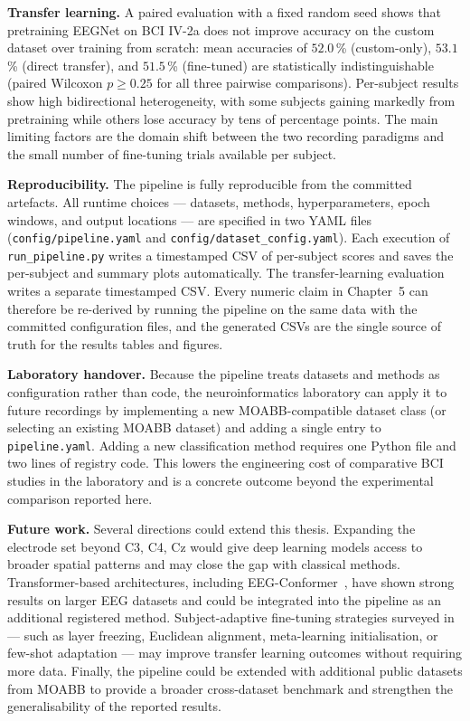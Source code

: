 \documentclass[english, bc, kiv, he, iso690alph, pdf]{fasthesis}
\begin{document}
\textbf{Transfer learning.} A paired evaluation with a fixed random seed shows that pretraining EEGNet on BCI IV-2a does not improve accuracy on the custom dataset over training from scratch: mean accuracies of $52.0$\,\% (custom-only), $53.1$\,\% (direct transfer), and $51.5$\,\% (fine-tuned) are statistically indistinguishable (paired Wilcoxon $p \geq 0.25$ for all three pairwise comparisons). Per-subject results show high bidirectional heterogeneity, with some subjects gaining markedly from pretraining while others lose accuracy by tens of percentage points. The main limiting factors are the domain shift between the two recording paradigms and the small number of fine-tuning trials available per subject.

\textbf{Reproducibility.} The pipeline is fully reproducible from the committed artefacts. All runtime choices — datasets, methods, hyperparameters, epoch windows, and output locations — are specified in two YAML files (\texttt{config/pipeline.yaml} and \texttt{config/dataset\_config.yaml}). Each execution of \texttt{run\_pipeline.py} writes a timestamped CSV of per-subject scores and saves the per-subject and summary plots automatically. The transfer-learning evaluation writes a separate timestamped CSV. Every numeric claim in Chapter~5 can therefore be re-derived by running the pipeline on the same data with the committed configuration files, and the generated CSVs are the single source of truth for the results tables and figures.

\textbf{Laboratory handover.} Because the pipeline treats datasets and methods as configuration rather than code, the neuroinformatics laboratory can apply it to future recordings by implementing a new MOABB-compatible dataset class (or selecting an existing MOABB dataset) and adding a single entry to \texttt{pipeline.yaml}. Adding a new classification method requires one Python file and two lines of registry code. This lowers the engineering cost of comparative BCI studies in the laboratory and is a concrete outcome beyond the experimental comparison reported here.

\textbf{Future work.} Several directions could extend this thesis. Expanding the electrode set beyond C3, C4, Cz would give deep learning models access to broader spatial patterns and may close the gap with classical methods. Transformer-based architectures, including EEG-Conformer~\cite{song2022conformer}, have shown strong results on larger EEG datasets and could be integrated into the pipeline as an additional registered method. Subject-adaptive fine-tuning strategies surveyed in~\cite{wu2022transfer,wan2021review} --- such as layer freezing, Euclidean alignment, meta-learning initialisation, or few-shot adaptation --- may improve transfer learning outcomes without requiring more data. Finally, the pipeline could be extended with additional public datasets from MOABB to provide a broader cross-dataset benchmark and strengthen the generalisability of the reported results.
\end{document}
